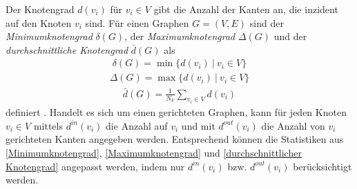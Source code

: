 \documentclass[12pt, a4paper]{report}
\begin{document}
Der Knotengrad $d(v_i)$ für $v_i \in V$ gibt die Anzahl der Kanten an, die inzident auf den Knoten $v_i$ sind. Für einen Graphen $G=(V,E)$ sind der \textit{Minimumknotengrad} $\delta(G)$, der \textit{Maximumknotengrad} $\Delta(G)$ und der \textit{durchschnittliche Knotengrad} $\bar{d}(G)$ als
\begin{align}
\delta(G)=\min\{d(v_i) \ | \ v_i \in V\}\label{Minimumknotengrad}
\end{align}
\begin{align}
\Delta(G)=\max\{d(v_i) \ | \ v_i \in V\}\label{Maximumknotengrad}
\end{align}
\begin{align}
\bar{d}(G)=\frac{1}{N_V}\sum_{v_i \in V}d(v_i)\label{durchschnittlicher Knotengrad}
\end{align}
definiert \cite{diestel2006graph}. Handelt es sich um einen gerichteten Graphen, kann für jeden Knoten $v_i \in V$ mittels $d^{in}(v_i)$ die Anzahl auf $v_i$ und mit $d^{out}(v_i)$ die Anzahl von $v_i$ gerichteten Kanten angegeben werden. Entsprechend können die Statistiken aus \eqref{Minimumknotengrad}, \eqref{Maximumknotengrad} und \eqref{durchschnittlicher Knotengrad} angepasst werden, indem nur $d^{in}(v_i)$ bzw. $d^{out}(v_i)$ berücksichtigt werden.\\
\end{document}
